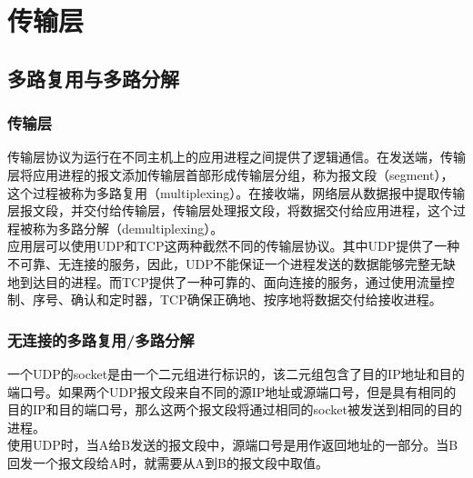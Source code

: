 \chapter{传输层}

\section{多路复用与多路分解}

\subsection{传输层}

传输层协议为运行在不同主机上的应用进程之间提供了逻辑通信。在发送端，传输层将应用进程的报文添加传输层首部形成传输层分组，称为报文段（segment），这个过程被称为多路复用（multiplexing）。在接收端，网络层从数据报中提取传输层报文段，并交付给传输层，传输层处理报文段，将数据交付给应用进程，这个过程被称为多路分解（demultiplexing）。\\

应用层可以使用UDP和TCP这两种截然不同的传输层协议。其中UDP提供了一种不可靠、无连接的服务，因此，UDP不能保证一个进程发送的数据能够完整无缺地到达目的进程。而TCP提供了一种可靠的、面向连接的服务，通过使用流量控制、序号、确认和定时器，TCP确保正确地、按序地将数据交付给接收进程。\\

\subsection{无连接的多路复用/多路分解}

一个UDP的socket是由一个二元组进行标识的，该二元组包含了目的IP地址和目的端口号。如果两个UDP报文段来自不同的源IP地址或源端口号，但是具有相同的目的IP和目的端口号，那么这两个报文段将通过相同的socket被发送到相同的目的进程。\\

使用UDP时，当A给B发送的报文段中，源端口号是用作返回地址的一部分。当B回发一个报文段给A时，就需要从A到B的报文段中取值。\\

